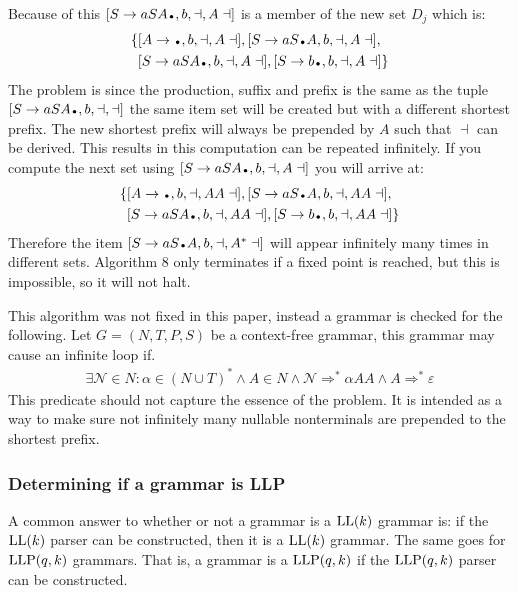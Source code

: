 Because of this $[S \to a SA\bigdot, b, \dashv, A \dashv]$ is a member of the new set $D_j$ which is:
\begin{align*}
    \{ &[A \to \bigdot , b, \dashv, A \dashv],[S \to a S\bigdot A, b, \dashv, A \dashv], \\
    & [S \to a S A\bigdot , b, \dashv, A \dashv],[S \to b\bigdot , b, \dashv, A \dashv]\}
\end{align*}
The problem is since the production, suffix and prefix is the same as the tuple $[S \to a S A\bigdot , b, \dashv, \dashv]$ the same item set will be created but with a different shortest prefix. The new shortest prefix will always be prepended by $A$ such that $\dashv$ can be derived. This results in this computation can be repeated infinitely. If you compute the next set using $[S \to a S A\bigdot , b, \dashv, A \dashv]$ you will arrive at:
\begin{align*}
    \{& [A \to \bigdot , b, \dashv, A A \dashv],[S \to a S\bigdot A, b, \dashv, A A \dashv], \\
    & [S \to a S A\bigdot , b, \dashv, A A \dashv],[S \to b\bigdot , b, \dashv, A A \dashv]\}
\end{align*}
Therefore the item $[S \to a S\bigdot A, b, \dashv, A^* \dashv]$ will appear infinitely many times in different sets. Algorithm 8 only terminates if a fixed point is reached, but this is impossible, so it will not halt.

This algorithm was not fixed in this paper, instead a grammar is checked for the following. Let $G = (N, T, P, S)$ be a context-free grammar, this grammar may cause an infinite loop if.
\begin{align*}
    \exists \mathcal{N} \in N : \alpha \in (N \cup T)^* \land A \in N \land \mathcal{N} \Rightarrow^* \alpha AA \land A \Rightarrow^* \varepsilon
\end{align*}
This predicate should not capture the essence of the problem. It is intended as a way to make sure not infinitely many nullable nonterminals are prepended to the shortest prefix.

\subsubsection{Determining if a grammar is LLP}
A common answer to whether or not a grammar is a $\text{LL}(k)$ grammar is: if the $\text{LL}(k)$ parser can be constructed, then it is a $\text{LL}(k)$ grammar. The same goes for $\text{LLP}(q,k)$ grammars. That is, a grammar is a $\text{LLP}(q,k)$ if the $\text{LLP}(q, k)$ parser can be constructed.

